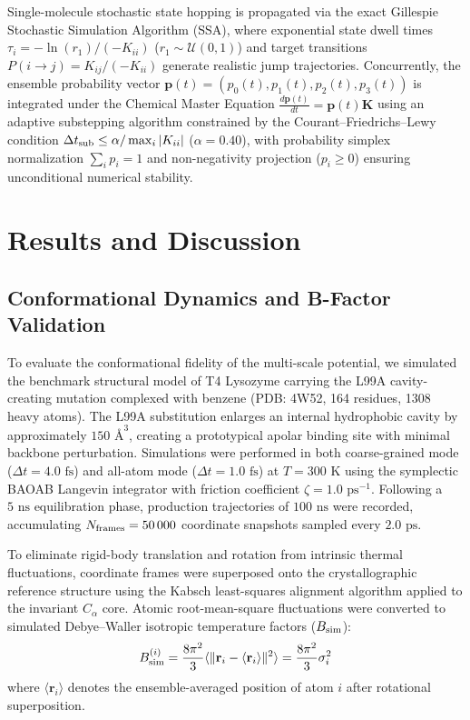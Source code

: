 \documentclass[journal=jpcbfk,manuscript=article]{achemso}
\begin{document}
Single-molecule stochastic state hopping is propagated via the exact Gillespie Stochastic Simulation Algorithm (SSA),\cite{gillespie1977exact} where exponential state dwell times $\tau_i = -\ln(r_1)/(-K_{ii})$ ($r_1 \sim \mathcal{U}(0, 1)$) and target transitions $P(i \to j) = K_{ij}/(-K_{ii})$ generate realistic jump trajectories. Concurrently, the ensemble probability vector $\mathbf{p}(t) = (p_0(t), p_1(t), p_2(t), p_3(t))$ is integrated under the Chemical Master Equation $\frac{d\mathbf{p}(t)}{dt} = \mathbf{p}(t) \mathbf{K}$ using an adaptive substepping algorithm constrained by the Courant--Friedrichs--Lewy condition $\Delta t_{\rm sub} \le \alpha / \max_i |K_{ii}|$ ($\alpha = 0.40$), with probability simplex normalization $\sum_i p_i = 1$ and non-negativity projection ($p_i \ge 0$) ensuring unconditional numerical stability.


\section{Results and Discussion}

\subsection{Conformational Dynamics and B-Factor Validation}
To evaluate the conformational fidelity of the multi-scale potential, we simulated the benchmark structural model of T4 Lysozyme carrying the L99A cavity-creating mutation complexed with benzene (PDB: 4W52, 164 residues, 1308 heavy atoms). The L99A substitution enlarges an internal hydrophobic cavity by approximately $150\text{ \AA}^3$, creating a prototypical apolar binding site with minimal backbone perturbation. Simulations were performed in both coarse-grained mode ($\Delta t = 4.0\text{ fs}$) and all-atom mode ($\Delta t = 1.0\text{ fs}$) at $T = 300\text{ K}$ using the symplectic BAOAB Langevin integrator with friction coefficient $\zeta = 1.0\text{ ps}^{-1}$. Following a $5\text{ ns}$ equilibration phase, production trajectories of $100\text{ ns}$ were recorded, accumulating $N_{\rm frames} = 50\,000$ coordinate snapshots sampled every $2.0\text{ ps}$.

To eliminate rigid-body translation and rotation from intrinsic thermal fluctuations, coordinate frames were superposed onto the crystallographic reference structure using the Kabsch least-squares alignment algorithm applied to the invariant $C_\alpha$ core. Atomic root-mean-square fluctuations were converted to simulated Debye--Waller isotropic temperature factors ($B_{\rm sim}$):
\begin{equation}
B_{\rm sim}^{(i)} = \frac{8\pi^2}{3} \langle \|\mathbf{r}_i - \langle \mathbf{r}_i \rangle\|^2 \rangle = \frac{8\pi^2}{3} \sigma_i^2
\end{equation}
where $\langle \mathbf{r}_i \rangle$ denotes the ensemble-averaged position of atom $i$ after rotational superposition.
\end{document}
